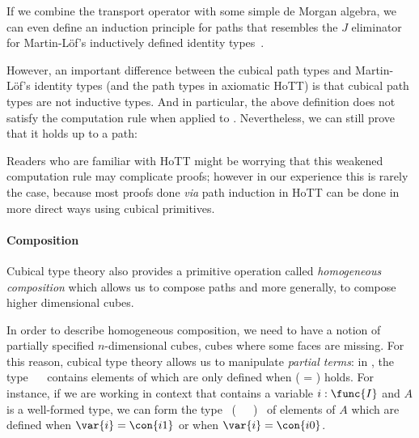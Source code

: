 If we combine the transport operator with some simple de Morgan algebra, we 
can even define an induction principle for paths that resembles 
the \( J \) eliminator for Martin-Löf's inductively defined identity 
types~.
%

However, an important difference between the cubical path types and
Martin-Löf's identity types (and the path types in axiomatic HoTT) is that
cubical path types are not inductive types.
% 
And in particular, the above definition does not satisfy the computation 
rule when applied to . 
% 
Nevertheless, we can still prove that it holds up to a path:
% 
%

Readers who are familiar with HoTT might be worrying that this weakened
computation rule may complicate proofs; however in our experience this 
is rarely the case, because most proofs done \textit{via} path induction 
in HoTT can be done in more direct ways using cubical primitives.
% 

\paragraph*{Composition}
% 
Cubical type theory also provides a primitive operation called \emph{homogeneous 
composition} which allows us to compose paths and more generally, to compose 
higher dimensional cubes. 

In order to describe homogeneous composition, we need to have a notion of 
partially specified $n$-dimensional cubes, \ie cubes where some faces are 
missing. 
% 
For this reason, cubical type theory allows us to manipulate \emph{partial terms}:
in \CubicalAgda, the type ~~ contains elements of
% 
% 
 which are only defined when ( = ) holds. 
% 
For instance, if we are working in context that contains a variable \( i : \func{I} \) 
and \( A \) is a well-formed type, we can 
form the type ~(~~~)~ 
of elements of \( A \) which are defined when \( \var{i} = \con{i1} \)
or when \( \var{i} = \con{i0} \).

